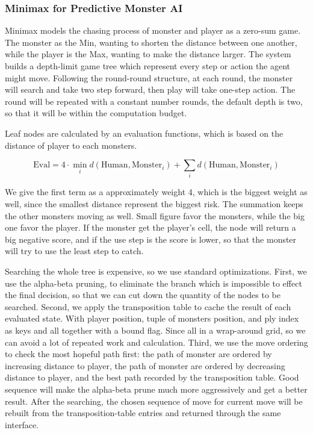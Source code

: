 \documentclass[12pt,a4paper]{article}
\begin{document}
\subsubsection{Minimax for Predictive Monster AI}

Minimax models the chasing process of monster and player as a zero-sum game. The monster as the Min, wanting to shorten the distance between one another, while the player is the Max, wanting to make the distance larger. The system builds a depth-limit game tree which represent every step or action the agent might move. Following the round-round structure, at each round, the monster will search and take two step forward, then play will take one-step action. The round will be repeated with a constant number rounds, the default depth is two, so that it will be within the computation budget.

Leaf nodes are calculated by an evaluation functions, which is based on the distance of player to each monsters.

\[
\text{Eval} = 4 \cdot \min_i d(\text{Human}, \text{Monster}_i)
+ \sum_i d(\text{Human}, \text{Monster}_i)
\]

We give the first term as a approximately weight 4, which is the biggest weight as well, since the smallest distance represent the biggest risk. The summation keeps the other monsters moving as well. Small figure favor the monsters, while the big one favor the player. If the monster get the player's cell, the node will return a big negative score, and if the use step is the score is lower, so that the monster will try to use the least step to catch.

Searching the whole tree is expensive, so we use standard optimizations. First, we use the alpha-beta pruning, to eliminate the branch which is impossible to effect the final decision, so that we can cut down the quantity of the nodes to be searched. Second, we apply the transposition table to cache the result of each evaluated state. With player position, tuple of monsters position, and ply index as keys and all together with a bound flag. Since all in a wrap-around grid, so we can avoid a lot of repeated work and calculation. Third, we use the move ordering to check the most hopeful path first: the path of monster are ordered by increasing distance to player, the path of monster are ordered by decreasing distance to player, and the best path recorded by the transposition table. Good sequence will make the alpha-beta prune much more aggressively and get a better result. After the searching, the chosen sequence of move for current move will be rebuilt from the transposition-table entries and returned through the same interface.
\end{document}
